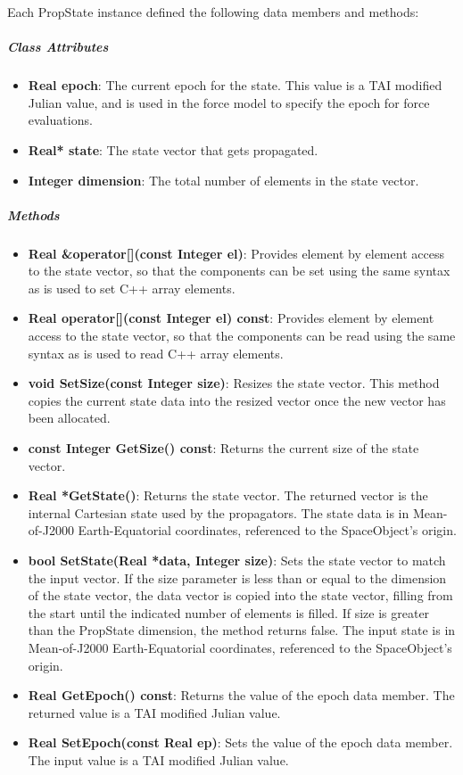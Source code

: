 Each PropState instance defined the following data members and methods:

\subparagraph{\textit{Class Attributes}}

\begin{itemize}
\item \textbf{Real epoch}: The current epoch for the state. This value is a TAI modified Julian
value, and is used in the force model to specify the epoch for force evaluations.
\item \textbf{Real* state}: The state vector that gets propagated.
\item \textbf{Integer dimension}: The total number of elements in the state vector.
\end{itemize}

\subparagraph{\textit{Methods}}

\begin{itemize}
\item \textbf{Real \&operator[](const Integer el)}:  Provides element by element access to the state
vector, so that the components can be set using the same syntax as is used to set C++ array
elements.
\item \textbf{Real operator[](const Integer el) const}:  Provides element by element access to the
state vector, so that the components can be read using the same syntax as is used to read C++ array
elements.
\item \textbf{void SetSize(const Integer size)}: Resizes the state vector.  This method copies the
current state data into the resized vector once the new vector has been allocated.
\item \textbf{const Integer GetSize() const}: Returns the current size of the state vector.
\item \textbf{Real *GetState()}: Returns the state vector.  The returned vector is the internal
Cartesian state used by the propagators.  The state data is in Mean-of-J2000 Earth-Equatorial
coordinates, referenced to the SpaceObject's origin.
\item \textbf{bool SetState(Real *data, Integer size)}:  Sets the state vector to match the input
vector. If the size parameter is less than or equal to the dimension of the state vector, the data
vector is copied into the state vector, filling from the start until the indicated number of
elements is filled.  If size is greater than the PropState dimension, the method returns false.  The
input state is in Mean-of-J2000 Earth-Equatorial coordinates, referenced to the SpaceObject's
origin.
\item \textbf{Real GetEpoch() const}: Returns the value of the epoch data member.  The returned
value is a TAI modified Julian value.
\item \textbf{Real SetEpoch(const Real ep)}: Sets the value of the epoch data member.  The input
value is a TAI modified Julian value.
\end{itemize}

